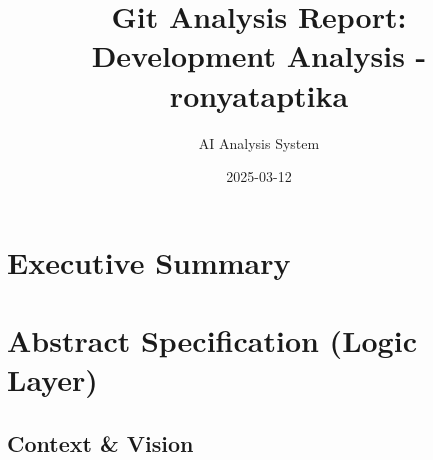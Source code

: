 \documentclass{article}
\begin{document}
\title{Git Analysis Report:\\Development Analysis - ronyataptika}
\author{AI Analysis System}
\date{2025-03-12}
\maketitle
\section*{Executive Summary}
\section{Abstract Specification (Logic Layer)}
\subsection{Context \& Vision}
\end{document}
